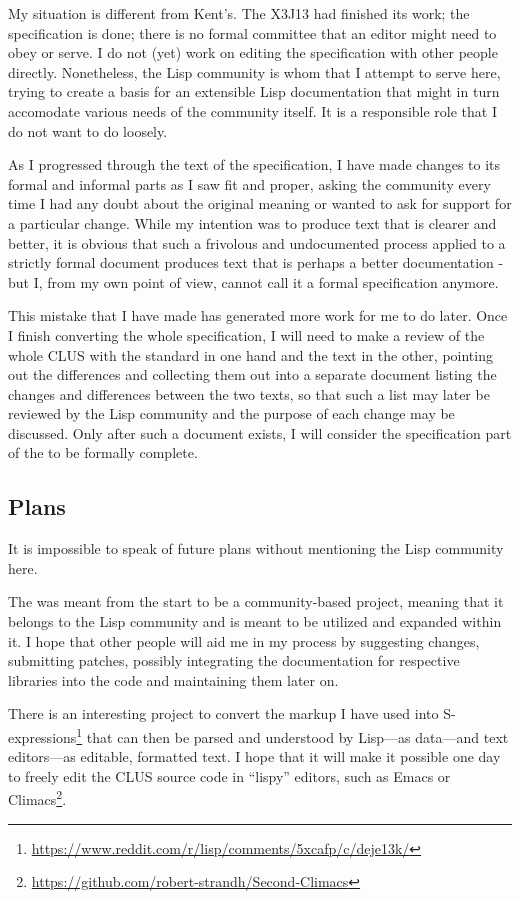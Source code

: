 My situation is different from Kent's. The X3J13 had finished its work; the specification is done; there is no formal committee that an editor might need to obey or serve.  I do not (yet) work on editing the specification with other people directly. Nonetheless, the Lisp community is whom that I attempt to serve here, trying to create a basis for an extensible Lisp documentation that might in turn accomodate various needs of the community itself. It is a responsible role that I do not want to do loosely.

As I progressed through the text of the specification, I have made changes to its formal and informal parts as I saw fit and proper, asking the community every time I had any doubt about the original meaning or wanted to ask for support for a particular change. While my intention was to produce text that is clearer and better, it is obvious that such a frivolous and undocumented process applied to a strictly formal document produces text that is perhaps a better documentation - but I, from my own point of view, cannot call it a formal specification anymore.

This mistake that I have made has generated more work for me to do later. Once I finish converting the whole specification, I will need to make a review of the whole CLUS with the standard in one hand and the \us{} text in the other, pointing out the differences and collecting them out into a separate document listing the changes and differences between the two texts, so that such a list may later be reviewed by the Lisp community and the purpose of each change may be discussed. Only after such a document exists, I will consider the specification part of the \us{} to be formally complete.

\subsection{Plans}

It is impossible to speak of future plans without mentioning the Lisp community here.

The \cl{} \us{} was meant from the start to be a community-based project, meaning that it belongs to the Lisp community and is meant to be utilized and expanded within it. I hope that other people will aid me in my process by suggesting changes, submitting patches, possibly integrating the documentation for respective \cl{} libraries into the code and maintaining them later on.

There is an interesting project to convert the markup I have used into S-expressions\footnote{\url{https://www.reddit.com/r/lisp/comments/5xcafp/c/deje13k/}} that can then be parsed and understood by Lisp---as data---and text editors---as editable, formatted text. I hope that it will make it possible one day to freely edit the CLUS source code in ``lispy'' editors, such as Emacs or Climacs\footnote{\url{https://github.com/robert-strandh/Second-Climacs}}.

